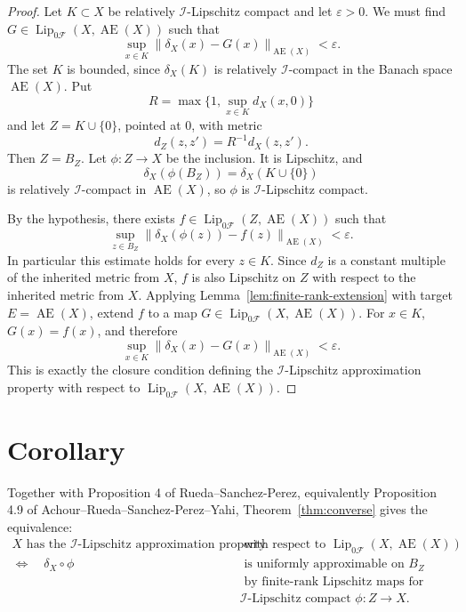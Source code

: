 \documentclass[11pt]{article}
\newcommand{\Lip}{\operatorname{Lip}}
\newcommand{\AEs}{\operatorname{AE}}
\begin{document}
\begin{proof}
Let \(K\subset X\) be relatively \(\mathcal I\)-Lipschitz compact and let
\(\varepsilon>0\).  We must find
\(G\in \Lip_{0\mathcal F}(X,\AEs(X))\) such that
\[
  \sup_{x\in K}\|\delta_X(x)-G(x)\|_{\AEs(X)}<\varepsilon .
\]
The set \(K\) is bounded, since \(\delta_X(K)\) is relatively
\(\mathcal I\)-compact in the Banach space \(\AEs(X)\).  Put
\[
  R=\max\{1,\sup_{x\in K} d_X(x,0)\}
\]
and let \(Z=K\cup\{0\}\), pointed at \(0\), with metric
\[
  d_Z(z,z')=R^{-1}d_X(z,z').
\]
Then \(Z=B_Z\).  Let \(\phi:Z\to X\) be the inclusion.  It is Lipschitz, and
\[
  \delta_X(\phi(B_Z))=\delta_X(K\cup\{0\})
\]
is relatively \(\mathcal I\)-compact in \(\AEs(X)\), so \(\phi\) is
\(\mathcal I\)-Lipschitz compact.

By the hypothesis, there exists
\(f\in \Lip_{0\mathcal F}(Z,\AEs(X))\) such that
\[
  \sup_{z\in B_Z}\|\delta_X(\phi(z))-f(z)\|_{\AEs(X)}<\varepsilon .
\]
In particular this estimate holds for every \(z\in K\).  Since \(d_Z\) is a
constant multiple of the inherited metric from \(X\), \(f\) is also Lipschitz
on \(Z\) with respect to the inherited metric from \(X\).  Applying
Lemma~\ref{lem:finite-rank-extension} with target \(E=\AEs(X)\), extend \(f\)
to a map \(G\in\Lip_{0\mathcal F}(X,\AEs(X))\).  For \(x\in K\), \(G(x)=f(x)\),
and therefore
\[
  \sup_{x\in K}\|\delta_X(x)-G(x)\|_{\AEs(X)}<\varepsilon .
\]
This is exactly the closure condition defining the
\(\mathcal I\)-Lipschitz approximation property with respect to
\(\Lip_{0\mathcal F}(X,\AEs(X))\).
\end{proof}

\section*{Corollary}

Together with Proposition 4 of Rueda--Sanchez-Perez, equivalently Proposition
4.9 of Achour--Rueda--Sanchez-Perez--Yahi, Theorem~\ref{thm:converse} gives
the equivalence:
\[
\begin{aligned}
X \text{ has the } \mathcal I\text{-Lipschitz approximation property}
&\text{ with respect to } \Lip_{0\mathcal F}(X,\AEs(X))\\
\Longleftrightarrow\quad
\delta_X\circ\phi
&\text{ is uniformly approximable on } B_Z \\
&\text{ by finite-rank Lipschitz maps for every }\\
&\mathcal I\text{-Lipschitz compact }\phi:Z\to X .
\end{aligned}
\]
\end{document}
